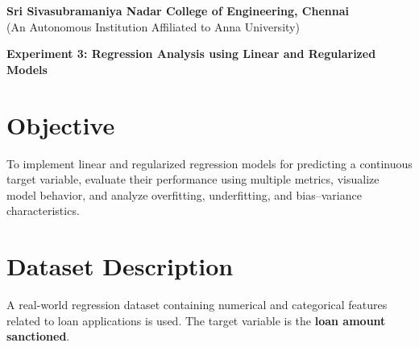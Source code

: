 \documentclass[11pt]{article}
\begin{document}
\begin{center}
    \large \textbf{Sri Sivasubramaniya Nadar College of Engineering, Chennai} \\
    (An Autonomous Institution Affiliated to Anna University) \\
    \vspace{0.3cm}
\end{center}

\begin{table}[!h]
\renewcommand{\arraystretch}{1.5}
\end{table}

\begin{center}
\textbf{Experiment 3: Regression Analysis using Linear and Regularized Models}
\end{center}

\section{Objective}
To implement linear and regularized regression models for predicting a continuous target variable, evaluate their performance using multiple metrics, visualize model behavior, and analyze overfitting, underfitting, and bias--variance characteristics.


\section{Dataset Description}
A real-world regression dataset containing numerical and categorical features related to loan applications is used.  
The target variable is the \textbf{loan amount sanctioned}.


\end{document}
